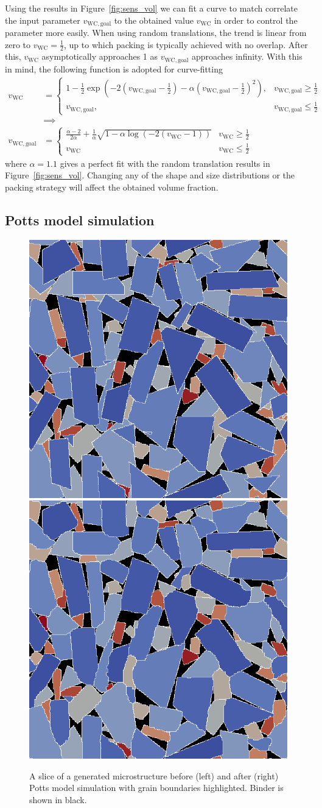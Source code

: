 \documentclass[3p,12pt]{elsarticle}
\newcommand{\WC}{\mathrm{WC}}
\begin{document}
Using the results in Figure~\ref{fig:sens_vol} we can fit a curve to match correlate the input parameter $v_{\WC,\text{goal}}$ to the obtained value $v_\WC$ in order to control the parameter more easily.
When using random translations, the trend is linear from zero to $v_\WC = \frac12$, up to which packing is typically achieved with no overlap.
After this, $v_\WC$ asymptotically approaches 1 as $v_{\WC,\text{goal}}$ approaches infinity.
With this in mind, the following function is adopted for curve-fitting
\begin{align}
 v_\WC &= \begin{cases}
  1 - \frac12\exp(- 2(v_{\WC,\text{goal}} -\frac12) - \alpha(v_{\WC,\text{goal}} -\frac12)^2 ), & v_{\WC,\text{goal}} \geq \frac12
  \\
  v_{\WC,\text{goal}}, & v_{\WC,\text{goal}} \leq \frac12
 \end{cases}
 \label{eq:v_wc}
 \\ 
 &\implies\nonumber
 \\
 v_{\WC,\text{goal}} &= \begin{cases}
    \frac{\alpha - 2}{2\alpha} + \frac1\alpha \sqrt{1 - \alpha\log(-2(v_\WC-1))} & v_\WC \geq \frac12
    \\
    v_\WC & v_\WC \leq \frac12
                       \end{cases}
                       \label{eq:inverse_v_wc}
\end{align}
where $\alpha = 1.1$ gives a perfect fit with the random translation results in Figure~\ref{fig:sens_vol}.
Changing any of the shape and size distributions or the packing strategy will affect the obtained volume fraction. 


\subsection{Potts model simulation}

\begin{figure}[H]
  \centering
  \includegraphics[width=.3\linewidth]{potts_example_before_10percent}
  \includegraphics[width=.3\linewidth]{potts_example_after_10percent}
  \caption{\label{fig:potts_before_after} A slice of a generated microstructure before (left) and after (right) Potts model simulation with grain boundaries highlighted. Binder is shown in black.}
\end{figure}
\end{document}
